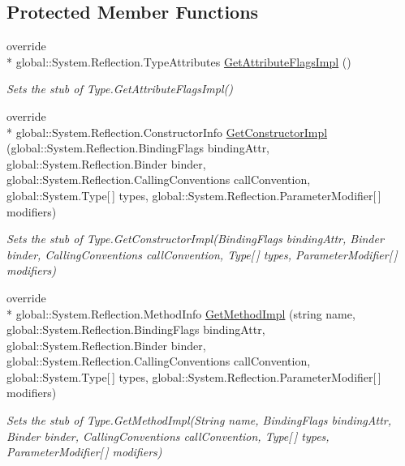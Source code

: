 \subsection*{Protected Member Functions}
\begin{DoxyCompactItemize}
\item 
override \\*
global\-::\-System.\-Reflection.\-Type\-Attributes \hyperlink{class_system_1_1_fakes_1_1_stub_type_a036d36a51ad9c73456e7faf9f7365a3f}{Get\-Attribute\-Flags\-Impl} ()
\begin{DoxyCompactList}\small\item\em Sets the stub of Type.\-Get\-Attribute\-Flags\-Impl()\end{DoxyCompactList}\item 
override \\*
global\-::\-System.\-Reflection.\-Constructor\-Info \hyperlink{class_system_1_1_fakes_1_1_stub_type_a80398d93350ab4a7f3a4e94e4ab1ca8e}{Get\-Constructor\-Impl} (global\-::\-System.\-Reflection.\-Binding\-Flags binding\-Attr, global\-::\-System.\-Reflection.\-Binder binder, global\-::\-System.\-Reflection.\-Calling\-Conventions call\-Convention, global\-::\-System.\-Type\mbox{[}$\,$\mbox{]} types, global\-::\-System.\-Reflection.\-Parameter\-Modifier\mbox{[}$\,$\mbox{]} modifiers)
\begin{DoxyCompactList}\small\item\em Sets the stub of Type.\-Get\-Constructor\-Impl(\-Binding\-Flags binding\-Attr, Binder binder, Calling\-Conventions call\-Convention, Type\mbox{[}$\,$\mbox{]} types, Parameter\-Modifier\mbox{[}$\,$\mbox{]} modifiers)\end{DoxyCompactList}\item 
override \\*
global\-::\-System.\-Reflection.\-Method\-Info \hyperlink{class_system_1_1_fakes_1_1_stub_type_a19e0a311fc26c7f704aa2ebc6176a5b1}{Get\-Method\-Impl} (string name, global\-::\-System.\-Reflection.\-Binding\-Flags binding\-Attr, global\-::\-System.\-Reflection.\-Binder binder, global\-::\-System.\-Reflection.\-Calling\-Conventions call\-Convention, global\-::\-System.\-Type\mbox{[}$\,$\mbox{]} types, global\-::\-System.\-Reflection.\-Parameter\-Modifier\mbox{[}$\,$\mbox{]} modifiers)
\begin{DoxyCompactList}\small\item\em Sets the stub of Type.\-Get\-Method\-Impl(\-String name, Binding\-Flags binding\-Attr, Binder binder, Calling\-Conventions call\-Convention, Type\mbox{[}$\,$\mbox{]} types, Parameter\-Modifier\mbox{[}$\,$\mbox{]} modifiers)\end{DoxyCompactList}\item 

\end{DoxyCompactItemize}
